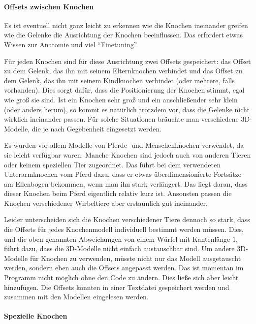 \paragraph{Offsets zwischen Knochen}
Es ist eventuell nicht ganz leicht zu erkennen wie die Knochen ineinander greifen \bzw wie die Gelenke die Ausrichtung der Knochen beeinflussen. Das erfordert etwas Wissen zur Anatomie und viel "`Finetuning"'. 

Für jeden Knochen sind für diese Ausrichtung zwei Offsets gespeichert: das Offset zu dem Gelenk, das ihn mit seinem Elternknochen verbindet und das Offset zu dem Gelenk, das ihn mit seinem Kindknochen verbindet (oder mehrere, falls vorhanden). Dies sorgt dafür, dass die Positionierung der Knochen stimmt, egal wie groß sie sind. Ist ein Knochen sehr groß und ein anschließender sehr klein (oder anders herum), so kommt es natürlich trotzdem vor, dass die Gelenke nicht wirklich ineinander passen. Für solche Situationen bräuchte man verschiedene 3D-Modelle, die je nach Gegebenheit eingesetzt werden.

Es wurden vor allem Modelle von Pferde- und Menschenknochen verwendet, da sie leicht verfügbar waren. Manche Knochen sind jedoch auch von anderen Tieren oder keinem speziellen Tier zugeordnet. Das führt \zb bei dem verwendeten Unterarmknochen vom Pferd dazu, dass er etwas überdimensionierte Fortsätze am Ellenbogen bekommen, wenn man ihn stark verlängert. Das liegt daran, dass dieser Knochen beim Pferd eigentlich relativ kurz ist. Ansonsten passen die Knochen verschiedener Wirbeltiere aber erstaunlich gut ineinander.

Leider unterscheiden sich die Knochen verschiedener Tiere dennoch so stark, dass die Offsets für jedes Knochenmodell individuell bestimmt werden müssen. Dies, und die oben genannten Abweichungen von einem Würfel mit Kantenlänge $1$, führt dazu, dass die 3D-Modelle nicht einfach austauschbar sind.
Um andere 3D-Modelle für Knochen zu verwenden, müsste nicht nur das Modell ausgetauscht werden, sondern eben auch die Offsets angepasst werden. Das ist momentan im Programm nicht möglich ohne den Code zu ändern. Dies ließe sich aber leicht hinzufügen. Die Offsets könnten \zb in einer Textdatei gespeichert werden und zusammen mit den Modellen eingelesen werden. 


\paragraph{Spezielle Knochen}

